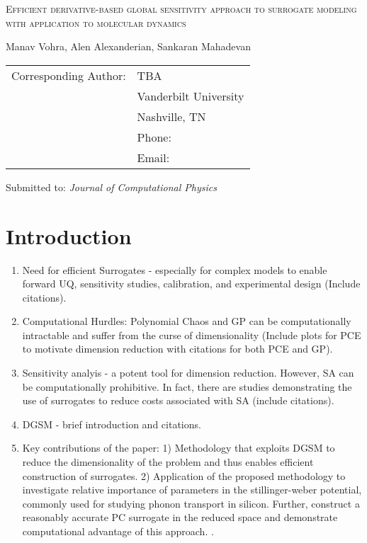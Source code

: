 \documentclass[letter,12pt]{article}
\begin{document}
\begin{center}
\textsc{
Efficient derivative-based global sensitivity approach to 
surrogate modeling with application to molecular dynamics
}

\bigskip 

\bigskip 

Manav Vohra, Alen Alexanderian, Sankaran Mahadevan

\end{center}

\vspace{10cm}

\begin{tabular}{ll}
Corresponding Author:  & TBA \\
                       & Vanderbilt University \\ 
                       & Nashville, TN\\ 
                       & Phone: \\ 
                       & Email: 
\end{tabular}

\bigskip

Submitted to: \emph{Journal of Computational Physics}
              



\clearpage

\tableofcontents

\section{Introduction}
\begin{enumerate}
\item Need for efficient Surrogates - especially for complex models to enable forward UQ, 
sensitivity studies, calibration, and experimental design (Include citations).
\item Computational Hurdles: Polynomial Chaos and GP can be computationally 
intractable and suffer from the curse of dimensionality (Include plots for PCE
to motivate dimension reduction with citations for both PCE and GP).
\item Sensitivity analyis - a potent tool for dimension reduction. However, SA can be
computationally prohibitive. In fact, there are studies demonstrating the use of 
surrogates to reduce costs associated with SA (include citations). 
\item DGSM - brief introduction and citations. 
\item Key contributions of the paper: 1) Methodology that exploits DGSM to reduce the
dimensionality of the problem and thus enables efficient construction of surrogates.
2) Application of the proposed methodology to investigate relative importance of
parameters in the stillinger-weber potential, commonly used for studying phonon transport in silicon. Further, construct a reasonably accurate PC surrogate in the reduced 
space and demonstrate computational advantage of this approach. .
\end{enumerate}
\end{document}
